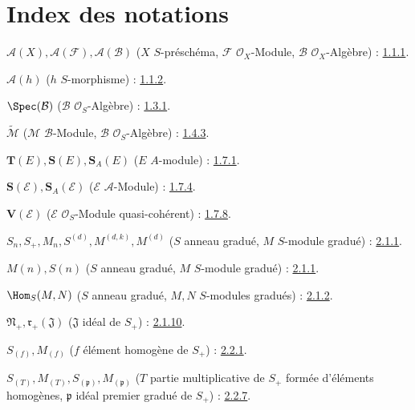 \clearpage
{}
{}
\section*{Index des notations}
\thispagestyle{plain}

\begingroup
\small
\setlength{\parindent}{0pt}
\setlength{\parskip}{2pt}
\newcommand{\egaShProj}{\mathcal{P}\!\mathit{roj}}

$\mathcal{A}(X),\mathcal{A}(\mathcal{F}),\mathcal{A}(\mathcal{B})$
($X$ $S$-préschéma, $\mathcal{F}$ $\mathcal{O}_X$-Module,
$\mathcal{B}$ $\mathcal{O}_X$-Algèbre) : \hyperref[II.1.1.1-fr]{1.1.1}.

$\mathcal{A}(h)$ ($h$ $S$-morphisme) : \hyperref[II.1.1.2-fr]{1.1.2}.

$\Spec(\mathcal{B})$ ($\mathcal{B}$ $\mathcal{O}_S$-Algèbre) : \hyperref[II.1.3.1-fr]{1.3.1}.

$\widetilde{\mathcal{M}}$ ($\mathcal{M}$ $\mathcal{B}$-Module,
$\mathcal{B}$ $\mathcal{O}_S$-Algèbre) : \hyperref[II.1.4.3-fr]{1.4.3}.

$\mathbf{T}(E),\mathbf{S}(E),\mathbf{S}_A(E)$ ($E$ $A$-module) : \hyperref[II.1.7.1-fr]{1.7.1}.

$\mathbf{S}(\mathcal{E}),\mathbf{S}_A(\mathcal{E})$
($\mathcal{E}$ $\mathcal{A}$-Module) : \hyperref[II.1.7.4-fr]{1.7.4}.

$\mathbf{V}(\mathcal{E})$ ($\mathcal{E}$ $\mathcal{O}_S$-Module quasi-cohérent) : \hyperref[II.1.7.8-fr]{1.7.8}.

$S_n,S_+,M_n,S^{(d)},M^{(d,k)},M^{(d)}$
($S$ anneau gradué, $M$ $S$-module gradué) : \hyperref[II.2.1.1-fr]{2.1.1}.

$M(n),S(n)$ ($S$ anneau gradué, $M$ $S$-module gradué) : \hyperref[II.2.1.1-fr]{2.1.1}.

$\Hom_S(M,N)$ ($S$ anneau gradué, $M,N$ $S$-modules gradués) : \hyperref[II.2.1.2-fr]{2.1.2}.

$\mathfrak N_+,\mathfrak r_+(\mathfrak J)$
($\mathfrak J$ idéal de $S_+$) : \hyperref[II.2.1.10-fr]{2.1.10}.

$S_{(f)},M_{(f)}$ ($f$ élément homogène de $S_+$) : \hyperref[II.2.2.1-fr]{2.2.1}.

$S_{(T)},M_{(T)},S_{(\mathfrak p)},M_{(\mathfrak p)}$
($T$ partie multiplicative de $S_+$ formée d'éléments homogènes,
$\mathfrak p$ idéal premier gradué de $S_+$) : \hyperref[II.2.2.7-fr]{2.2.7}.

